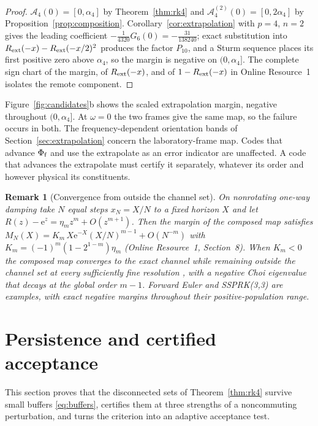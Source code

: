 \documentclass[pdflatex,sn-mathphys-num]{sn-jnl}
\newcommand{\e}{\mathrm{e}}
\newcommand{\Adm}{\mathcal A}
\theoremstyle{thmstyleone}
\theoremstyle{thmstylethree}
\theoremstyle{thmstyletwo}
\newtheorem{remark}{Remark}
\begin{document}
\begin{proof}
$\Adm_4(0)=[0,\alpha_4]$ by Theorem~\ref{thm:rk4} and $\Adm_4^{(2)}(0)=[0,2\alpha_4]$ by Proposition~\ref{prop:composition}. Corollary~\ref{cor:extrapolation} with $p=4$, $n=2$ gives the leading coefficient $-\tfrac1{4320}G_6(0)=-\tfrac{31}{138240}$; exact substitution into $R_{\rm ext}(-x)-R_{\rm ext}(-x/2)^2$ produces the factor $P_{10}$, and a Sturm sequence places its first positive zero above $\alpha_4$, so the margin is negative on $(0,\alpha_4]$. The complete sign chart of the margin, of $R_{\rm ext}(-x)$, and of $1-R_{\rm ext}(-x)$ in Online Resource~1 isolates the remote component.
\end{proof}

Figure~\ref{fig:candidates}b shows the scaled extrapolation margin, negative throughout $(0,\alpha_4]$. At $\omega=0$ the two frames give the same map, so the failure occurs in both. The frequency-dependent orientation bands of Section~\ref{sec:extrapolation} concern the laboratory-frame map. Codes that advance $\Phi_{\rm f}$ and use the extrapolate as an error indicator are unaffected. A code that advances the extrapolate must certify it separately, whatever its order and however physical its constituents.

\begin{remark}[Convergence from outside the channel set]\label{rem:fixed_horizon}
On nonrotating one-way damping take $N$ equal steps $x_N=X/N$ to a fixed horizon $X$ and let $R(z)-\e^z=\eta_mz^m+O(z^{m+1})$. Then the margin of the composed map satisfies
$M_N(X)=K_m\,X\e^{-X}(X/N)^{m-1}+O(N^{-m})$ with $K_m=(-1)^m(1-2^{1-m})\eta_m$ (Online Resource~1, Section~8). When $K_m<0$ the composed map converges to the exact channel while remaining outside the channel set at every sufficiently fine resolution \cite{PierpointBernardLiu2026Note}, with a negative Choi eigenvalue that decays at the global order $m-1$. Forward Euler and SSPRK(3,3) are examples, with exact negative margins throughout their positive-population range.
\end{remark}
\section{Persistence and certified acceptance}\label{sec:guard}

This section proves that the disconnected sets of Theorem~\ref{thm:rk4} survive small buffers \eqref{eq:buffers}, certifies them at three strengths of a noncommuting perturbation, and turns the criterion into an adaptive acceptance test.
\end{document}
